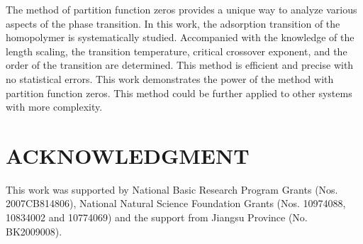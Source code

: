 \documentclass[aps,pre,twocolumn,showpacs,preprintnumbers,amsmath,amssymb]{revtex4-1}
\begin{document}

The method of partition function zeros provides a unique way to analyze various
aspects of the phase transition. In this work, the adsorption transition of
the homopolymer is systematically studied. Accompanied with the knowledge
of the length scaling, the transition temperature, critical crossover
exponent, and the order of the transition are determined. This method is
efficient and precise with no statistical errors. This work demonstrates
the power of the method with partition function zeros. This method could
be further applied to other systems with more complexity.

\section*{ACKNOWLEDGMENT}
This work was supported by National Basic Research Program Grants
(Nos. 2007CB814806), National Natural Science Foundation Grants
(Nos. 10974088, 10834002 and 10774069) and the support from
Jiangsu Province (No. BK2009008).
\end{document}

